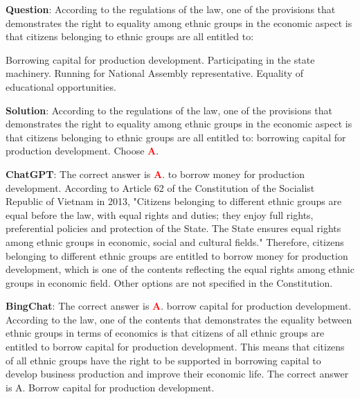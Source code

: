 \documentclass{article}
\begin{document}
{	
	
	\begin{mdframed}[linewidth=1pt,linecolor=red] \textbf{Question}: According to the regulations of the law, one of the provisions that demonstrates the right to equality among ethnic groups in the economic aspect is that citizens belonging to ethnic groups are all entitled to:
		
		\begin{choices}
			\choice Borrowing capital for production development.
			\choice Participating in the state machinery.
			\choice Running for National Assembly representative.
			\choice Equality of educational opportunities.
		\end{choices}
		
		\textbf{Solution}: According to the regulations of the law, one of the provisions that demonstrates the right to equality among ethnic groups in the economic aspect is that citizens belonging to ethnic groups are all entitled to: borrowing capital for production development. Choose \textcolor{red}{\textbf{A}}.
		
		\textbf{ChatGPT}: The correct answer is \textcolor{red}{\textbf{A}}. to borrow money for production development. According to Article 62 of the Constitution of the Socialist Republic of Vietnam in 2013, "Citizens belonging to different ethnic groups are equal before the law, with equal rights and duties; they enjoy full rights, preferential policies and protection of the State. The State ensures equal rights among ethnic groups in economic, social and cultural fields." Therefore, citizens belonging to different ethnic groups are entitled to borrow money for production development, which is one of the contents reflecting the equal rights among ethnic groups in economic field. Other options are not specified in the Constitution.
		
		\textbf{BingChat}: The correct answer is \textcolor{red}{\textbf{A}}. borrow capital for production development. According to the law, one of the contents that demonstrates the equality between ethnic groups in terms of economics is that citizens of all ethnic groups are entitled to borrow capital for production development. This means that citizens of all ethnic groups have the right to be supported in borrowing capital to develop business production and improve their economic life. The correct answer is A. Borrow capital for production development.
		
		
	\end{mdframed}	
	
}
\end{document}
